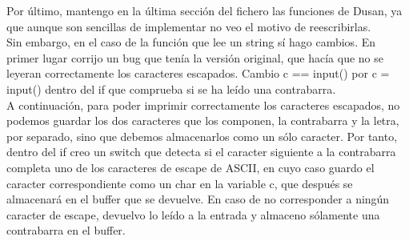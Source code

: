 \documentclass{article}
\begin{document}
Por último, mantengo en la última sección del fichero las funciones de Dusan, ya que aunque son sencillas de implementar no veo el motivo de reescribirlas.\\
Sin embargo, en el caso de la función que lee un string sí hago cambios. En primer lugar corrijo un bug que tenía la versión original, que hacía que no se leyeran correctamente los caracteres escapados. Cambio c == input() por c = input() dentro del if que comprueba si se ha leído una contrabarra.\\
A continuación, para poder imprimir correctamente los caracteres escapados, no podemos guardar los dos caracteres que los componen, la contrabarra y la letra, por separado, sino que debemos almacenarlos como un sólo caracter. Por tanto, dentro del if creo un switch que detecta si el caracter siguiente a la contrabarra completa uno de los caracteres de escape de ASCII, en cuyo caso guardo el caracter correspondiente como un char en la variable c, que después se almacenará en el buffer que se devuelve. En caso de no corresponder a ningún caracter de escape, devuelvo lo leído a la entrada y almaceno sólamente una contrabarra en el buffer.
\end{document}
